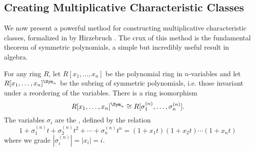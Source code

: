%
%
%
%

\subsection{Creating Multiplicative Characteristic Classes}

We now present a powerful method for constructing multiplicative characteristic classes, formalized in by Hirzebruch \cite{hirzebruch1966methods}.
The crux of this method is the fundamental theorem of symmetric polynomials, a simple but incredibly useful result in algebra.

\begin{theorem}
	For any ring $R$, let $R[x_1,\ldots, x_n]$ be the polynomial ring in $n$-variables and let $R[x_1,\ldots, x_n]^{\Sym_n}$ be the subring of symmetric polynomials, i.e. those invariant under a reordering of the variables. There is a ring isomorphism
	\begin{equation}\label{eq:symmetric-polynomial-isomorphism}
		R[x_1,\ldots, x_n]^{\Sym_n} \cong R[\sigma_1^{(n)},\ldots, \sigma_n^{(n)}].
	\end{equation}
	The variables $\sigma_i$ are the , defined by the relation
	\begin{equation}\label{eq:symmetric-polynomials}
		1+\sigma_1^{(n)}t+\sigma_2^{(n)}t^2+\cdots+\sigma_n^{(n)}t^n = (1+x_1t)(1+x_2t)\cdots (1+x_nt)
	\end{equation}
	where we grade $|\sigma_i^{(n)}|=|x_i|=i$.
\end{theorem}

